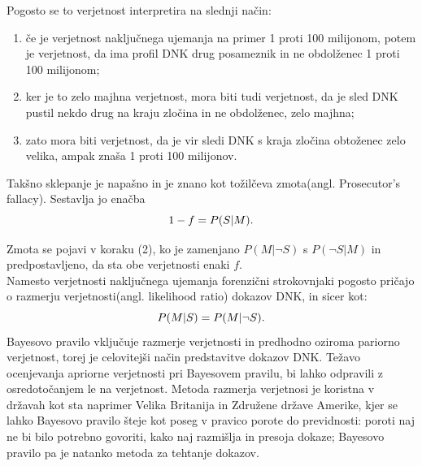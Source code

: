 \documentclass[12pt,a4paper]{amsart}
\theoremstyle{definition} %
\theoremstyle{plain} %
\begin{document}
Pogosto se to verjetnost interpretira na slednji način:
\begin{enumerate}
    \item če je verjetnost naključnega ujemanja na primer 1 proti 100 milijonom, potem je verjetnost, da ima profil DNK drug posameznik in ne 
    obdolženec 1 proti 100 milijonom;
    \item ker je to zelo majhna verjetnost, mora biti tudi verjetnost, da je sled DNK pustil nekdo drug na kraju zločina in ne obdolženec, zelo majhna;
    \item zato mora biti verjetnost, da je vir sledi DNK s kraja zločina obtoženec zelo velika, ampak znaša 1 proti 100 milijonov.
\end{enumerate}
Takšno sklepanje je napašno in je znano kot tožilčeva zmota(angl. Prosecutor’s fallacy). Sestavlja jo enačba \vspace{3mm}
\begin{equation}\label{eq:tozilcevazmota}
    1 - f = P(S \lvert M).\vspace{3mm}
\end{equation}

Zmota se pojavi v koraku (2), ko je zamenjano $P(M \lvert \neg S)$ s $P(\neg S \lvert M)$ in predpostavljeno, da sta obe verjetnosti enaki $f$. \\

Namesto verjetnosti naključnega ujemanja forenzični strokovnjaki pogosto pričajo o razmerju verjetnosti(angl. likelihood ratio) dokazov DNK, in 
sicer kot: \vspace{3mm}
\[P(M \lvert S) = P(M \lvert \neg S). \vspace{3mm}\]
Bayesovo pravilo vključuje razmerje verjetnosti in predhodno oziroma pariorno verjetnost, torej je celovitejši način predstavitve dokazov DNK. 
Težavo ocenjevanja apriorne verjetnosti pri Bayesovem pravilu, bi lahko odpravili z osredotočanjem le na verjetnost. Metoda razmerja verjetnosi je 
koristna v državah kot sta naprimer Velika Britanija in Združene države Amerike, kjer se lahko Bayesovo pravilo šteje kot poseg v pravico porote 
do previdnosti: poroti naj ne bi bilo potrebno govoriti, kako naj razmišlja in presoja dokaze; Bayesovo pravilo pa je natanko metoda za 
tehtanje dokazov. \\\\

\end{document}
